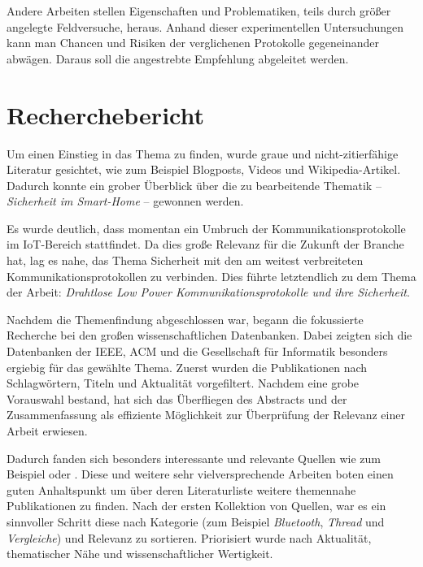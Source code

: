 \documentclass{article}
\newcommand{\titlecontent}{Drahtlose Low Power Kommunikationsprotokolle und ihre Sicherheit}
\begin{document}
Andere Arbeiten stellen Eigenschaften und Problematiken, teils durch größer
angelegte Feldversuche, heraus. Anhand dieser experimentellen Untersuchungen
kann man Chancen und Risiken der verglichenen Protokolle gegeneinander abwägen.
Daraus soll die angestrebte Empfehlung abgeleitet werden.

\section{Recherchebericht}

Um einen Einstieg in das Thema zu finden, wurde graue und nicht-zitierfähige
Literatur gesichtet, wie zum Beispiel Blogposts, Videos und Wikipedia-Artikel.
Dadurch konnte ein grober Überblick über die zu bearbeitende Thematik –
\textit{Sicherheit im Smart-Home} – gewonnen werden.

Es wurde deutlich, dass momentan ein Umbruch der Kommunikationsprotokolle im
IoT-Bereich stattfindet. Da dies große Relevanz für die Zukunft der Branche
hat, lag es nahe, das Thema Sicherheit mit den am weitest verbreiteten
Kommunikationsprotokollen zu verbinden. Dies führte letztendlich zu dem Thema
der Arbeit: \textit{\titlecontent}.



Nachdem die Themenfindung abgeschlossen war, begann die fokussierte Recherche
bei den großen wissenschaftlichen Datenbanken. Dabei zeigten sich die
Datenbanken der IEEE, ACM und die Gesellschaft für Informatik besonders
ergiebig für das gewählte Thema.  Zuerst wurden die Publikationen nach
Schlagwörtern, Titeln und Aktualität vorgefiltert. Nachdem eine grobe
Vorauswahl bestand, hat sich das Überfliegen des Abstracts und der
Zusammenfassung als effiziente Möglichkeit zur Überprüfung der Relevanz einer
Arbeit erwiesen. 

Dadurch fanden sich besonders interessante und relevante Quellen wie zum
Beispiel \textcite{BluetoothLowEnergyAttackOxford} oder
\textcite{ThreadMeshVsOtherWirelessIEEE}. Diese und weitere sehr
vielversprechende Arbeiten boten einen guten Anhaltspunkt um über deren
Literaturliste weitere themennahe Publikationen zu finden. Nach der ersten
Kollektion von Quellen, war es ein sinnvoller Schritt diese nach Kategorie (zum
Beispiel \textit{Bluetooth}, \textit{Thread} und \textit{Vergleiche}) und
Relevanz zu sortieren. Priorisiert wurde nach Aktualität, thematischer Nähe und
wissenschaftlicher Wertigkeit.
\end{document}
